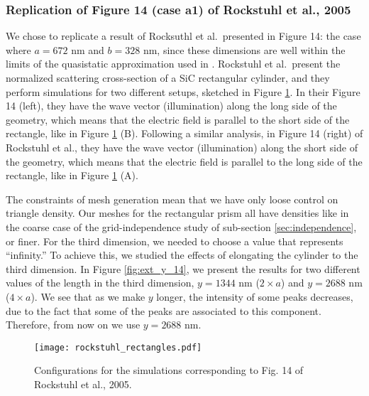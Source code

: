 \subsubsection{Replication of Figure 14 (case a1) of Rockstuhl et al., 2005}

We chose to replicate a result of Rocksuthl et al.\ presented in Figure 14: 
the case where $a=672$ nm 
and $b=328$ nm, since these dimensions are well within the limits of the quasistatic approximation 
used in \pygbe. Rockstuhl et al.\ present the normalized scattering cross-section of a SiC rectangular 
cylinder, and they perform simulations for two different setups, sketched in Figure \ref{fig:rectangle_sketch}. In 
their Figure 14 (left), they have the wave vector (illumination) along the long 
side of the geometry, which means that the electric field is parallel to the short side of the rectangle, like in 
Figure \ref{fig:rectangle_sketch} (B). Following a similar analysis, in Figure 14 (right) of Rockstuhl et al., they have the wave 
vector (illumination) along the short side of the geometry, which means that the electric field is parallel to the 
long side of the rectangle, like in Figure \ref{fig:rectangle_sketch} (A). 

The constraints of mesh generation mean that we have only loose control on triangle density. Our meshes for the rectangular prism all have densities like in the coarse case of the grid-independence study of sub-section \ref{sec:independence}, or finer.
For the third dimension, we needed to choose a value that represents ``infinity.'' To achieve this, we studied the effects of 
elongating the cylinder to the third dimension. In Figure \ref{fig:ext_y_14}, we present the results for two different
values of the length in the third dimension, $y=1344$ nm ($2\times a$) and $y=2688$ nm ($4\times a$). We see that as we make $y$ longer, the 
intensity of some peaks decreases, due to the fact that some of the peaks are associated to this component. Therefore, 
from now on we use $y=2688$ nm. 

\begin{figure}
    \centering
    \texttt{[image: rockstuhl\_rectangles.pdf]} 
    \caption{Configurations for the simulations corresponding to Fig. 14 of Rockstuhl et al., 2005.}
    \label{fig:rectangle_sketch}
\end{figure}

